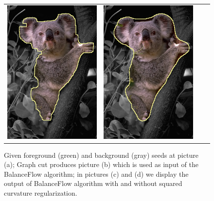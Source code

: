 \begin{figure}
\begin{tabular}{cccc}
 	\includegraphics[scale=0.25]{figures/chapter7/segmentation/coala/k-0.0/corrected-seg.png} &  	
 	\includegraphics[scale=0.25]{figures/chapter7/segmentation/coala/k-1.0/corrected-seg.png}
\end{tabular}	
\caption{ Given foreground (green) and background (gray) seeds at picture (a); Graph cut produces picture (b) which is used as input of the BalanceFlow algorithm; in pictures (c) and (d) we display the output of BalanceFlow algorithm with and without squared curvature regularization. }
\label{ch7:fig:ch7-segmentation}
\end{figure}


